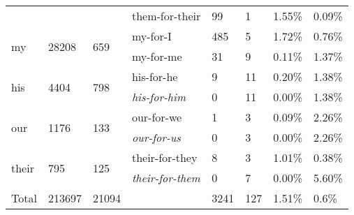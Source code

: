 \begin{table}[!h]
\begin{tabular}{l|ll|l|ll|ll}
 &  &  & them-for-their & 99 & 1 & 1.55\% & 0.09\% \\
\multirow{2}{*}{my} & \multirow{2}{*}{28208} & \multirow{2}{*}{659} & my-for-I & 485 & 5 & 1.72\% & 0.76\% \\
 &  &  & my-for-me & 31 & 9 & 0.11\% & 1.37\% \\
\multirow{2}{*}{his} & \multirow{2}{*}{4404} & \multirow{2}{*}{798} & his-for-he & 9 & 11 & 0.20\% & 1.38\% \\
 &  &  & \textit{his-for-him} & 0 & 11 & 0.00\% & 1.38\% \\
\multirow{2}{*}{our} & \multirow{2}{*}{1176} & \multirow{2}{*}{133} & our-for-we & 1 & 3 & 0.09\% & 2.26\% \\
 &  &  & \textit{our-for-us} & 0 & 3 & 0.00\% & 2.26\% \\
\multirow{2}{*}{their} & \multirow{2}{*}{795} & \multirow{2}{*}{125} & their-for-they & 8 & 3 & 1.01\% & 0.38\% \\
 &  &  & \textit{their-for-them} & 0 & 7 & 0.00\% & 5.60\% \\
Total & 213697 & 21094 &  & 3241 & 127 & 1.51\% & 0.6\%\\
\bottomrule
\end{tabular}
\end{table}
\FloatBarrier